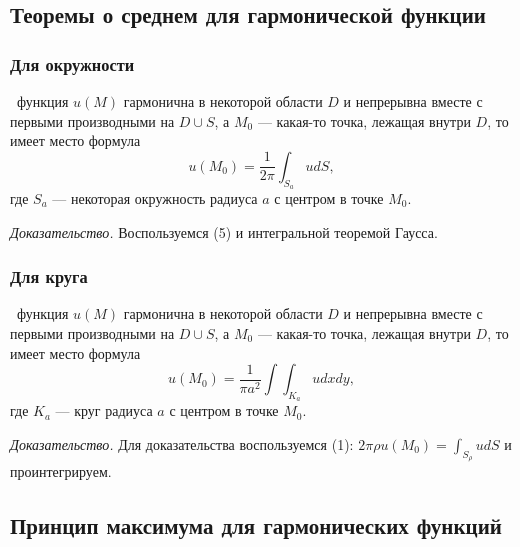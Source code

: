 \documentclass[9pt]{article}
\begin{document}
\subsection{Теоремы о среднем для гармонической функции}

\subsubsection{Для окружности}

\ 
 функция \(u(M)\) гармонична в некоторой области \(D\) и непрерывна вместе с первыми производными на \(D\cup S\), а \(M_0\) --- какая-то точка, лежащая внутри \(D\), то имеет место формула
\begin{equation}
    u(M_0)=\dfrac{1}{2\pi}\int_{S_a}udS,
\end{equation}
где \(S_a\) --- некоторая окружность радиуса \(a\) с центром в точке \(M_0\).
\par\textit{Доказательство.} Воспользуемся (5) и интегральной теоремой Гаусса.

\subsubsection{Для круга}

\ 
 функция \(u(M)\) гармонична в некоторой области \(D\) и непрерывна вместе с первыми производными на \(D\cup S\), а \(M_0\) --- какая-то точка, лежащая внутри \(D\), то имеет место формула
\begin{equation}
    u(M_0)=\dfrac{1}{\pi a^2}\int\int_{K_a}udxdy,
\end{equation}
где \(K_a\) --- круг радиуса \(a\) с центром в точке \(M_0\).
\par\textit{Доказательство.} Для доказательства воспользуемся (1): \(2\pi\rho u(M_0)=\int_{S_\rho}udS\) и проинтегрируем.

\subsection{Принцип максимума для гармонических функций}
\end{document}
